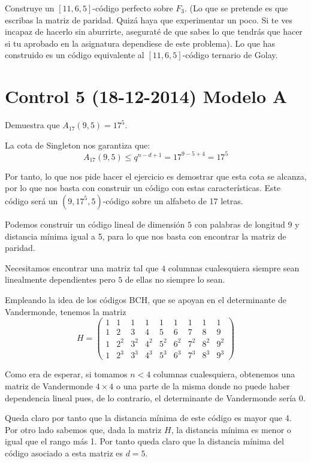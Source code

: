 \begin{problem}[15]
 Construye un $[11,6,5]$-código perfecto sobre $ F_3$. (Lo
que se pretende es que escribas la matriz de paridad. Quizá haya
que experimentar un poco. Si te ves incapaz de hacerlo sin
aburrirte, aseguraté de que sabes lo que tendrás que hacer si tu
aprobado en la asignatura dependiese de este problema). Lo que has
construido es un código equivalente al $[11,6,5]$-código ternario
de Golay.
\solution
\end{problem}

\section{Control 5 (18-12-2014) Modelo A}
\begin{problem}[1]
Demuestra que $A_{17}(9,5)=17^5$.
\solution

La cota de Singleton nos garantiza que:
\[A_{17}(9,5) \leq q^{n-d+1} = 17^{9-5+4} = 17^5\]

Por tanto, lo que nos pide hacer el ejercicio es demostrar que esta cota se alcanza, por lo que nos basta con construir un código con estas características. Este código será un $(9,17^5,5)$-código sobre un alfabeto de 17 letras.

Podemos construir un código lineal de dimensión $5$ con palabras de longitud 9 y distancia mínima igual a 5, para lo que nos basta con encontrar la matriz de paridad.

Necesitamos encontrar una matriz tal que $4$ columnas cualesquiera siempre sean linealmente dependientes pero $5$ de ellas no siempre lo sean.

Empleando la idea de los códigos BCH, que se apoyan en el determinante de Vandermonde, tenemos la matriz
\[H = \left(\begin{array}{ccccccccc}
1 & 1 & 1 & 1 & 1 & 1 & 1 & 1 & 1 \\
1 & 2 & 3 & 4 & 5 & 6 & 7 & 8 & 9 \\
1 & 2^2 & 3^2 & 4^2 & 5^2 & 6^2 & 7^2 & 8^2 & 9^2 \\
1 & 2^3 & 3^3 & 4^3 & 5^3 & 6^3 & 7^3 & 8^3 & 9^3
\end{array} \right)\]

Como era de esperar, si tomamos $n<4$ columnas cualesquiera, obtenemos una matriz de Vandermonde $4\times 4$ o una parte de la misma donde no puede haber dependencia lineal pues, de lo contrario, el determinante de Vandermonde sería 0.

Queda claro por tanto que la distancia mínima de este código es mayor que 4. Por otro lado sabemos que, dada la matriz $H$, la distancia mínima es menor o igual que el rango más 1. Por tanto queda claro que la distancia mínima del código asociado a esta matriz es $d=5$.


\end{problem}

